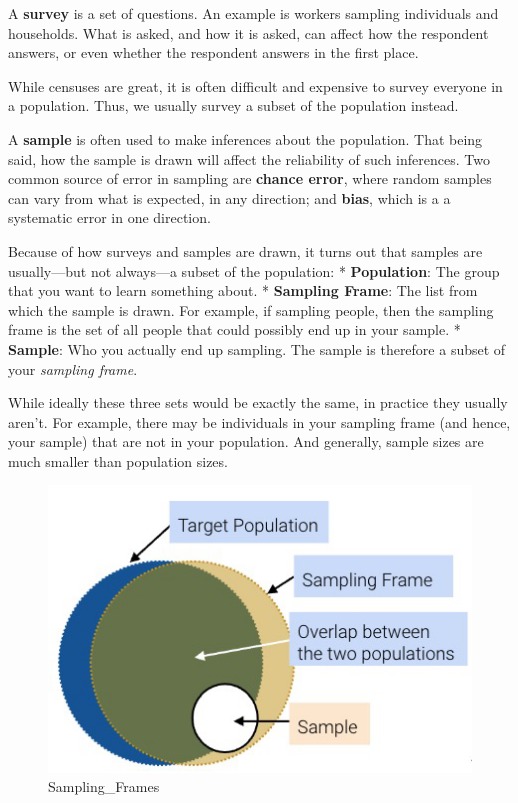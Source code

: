 \documentclass[
  letterpaper,
  DIV=11,
  numbers=noendperiod]{scrreprt}
\begin{document}
A \textbf{survey} is a set of questions. An example is workers sampling
individuals and households. What is asked, and how it is asked, can
affect how the respondent answers, or even whether the respondent
answers in the first place.

While censuses are great, it is often difficult and expensive to survey
everyone in a population. Thus, we usually survey a subset of the
population instead.

A \textbf{sample} is often used to make inferences about the population.
That being said, how the sample is drawn will affect the reliability of
such inferences. Two common source of error in sampling are
\textbf{chance error}, where random samples can vary from what is
expected, in any direction; and \textbf{bias}, which is a a systematic
error in one direction.

Because of how surveys and samples are drawn, it turns out that samples
are usually---but not always---a subset of the population: *
\textbf{Population}: The group that you want to learn something about. *
\textbf{Sampling Frame}: The list from which the sample is drawn. For
example, if sampling people, then the sampling frame is the set of all
people that could possibly end up in your sample. * \textbf{Sample}: Who
you actually end up sampling. The sample is therefore a subset of your
\emph{sampling frame}.

While ideally these three sets would be exactly the same, in practice
they usually aren't. For example, there may be individuals in your
sampling frame (and hence, your sample) that are not in your population.
And generally, sample sizes are much smaller than population sizes.

\begin{figure}

{\centering \includegraphics{sampling/images/samplingframe.PNG}

}

\caption{Sampling\_Frames}

\end{figure}
\end{document}
